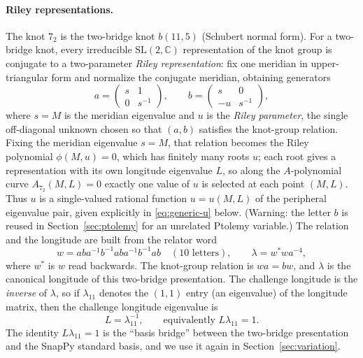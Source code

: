 \documentclass[11pt]{article}
\theoremstyle{definition}
\newcommand{\C}{\mathbb{C}}
\newcommand{\SL}{\mathrm{SL}}
\begin{document}
\paragraph{Riley representations.}
The knot $7_2$ is the two-bridge knot $b(11,5)$ (Schubert normal form).  For a
two-bridge knot, every irreducible $\SL(2,\C)$ representation of the knot group
is conjugate to a two-parameter \emph{Riley representation}: fix one meridian in
upper-triangular form and normalize the conjugate meridian, obtaining generators
\begin{equation}\label{eq:riley}
 a=\begin{pmatrix}s&1\\0&s^{-1}\end{pmatrix},\qquad
 b=\begin{pmatrix}s&0\\-u&s^{-1}\end{pmatrix},
\end{equation}
where $s=M$ is the meridian eigenvalue and $u$ is the \emph{Riley parameter},
the single off-diagonal unknown chosen so that $(a,b)$ satisfies the knot-group
relation.  Fixing the meridian eigenvalue $s=M$, that relation becomes the Riley
polynomial $\phi(M,u)=0$, which has finitely many roots $u$; each root gives a
representation with its own longitude eigenvalue $L$, so along the $A$-polynomial
curve $A_{7_2}(M,L)=0$ exactly one value of $u$ is selected at each point
$(M,L)$.  Thus $u$ is a single-valued rational function $u=u(M,L)$ of the
peripheral eigenvalue pair, given explicitly in \eqref{eq:generic-u} below.
(Warning: the letter $b$ is reused in Section~\ref{sec:ptolemy} for
an unrelated Ptolemy variable.)  The relation and the longitude are built from
the relator word
\begin{equation}\label{eq:word}
 w=aba^{-1}b^{-1}aba^{-1}b^{-1}ab
 \quad(\text{10 letters}),
 \qquad \lambda=w^*wa^{-4},
\end{equation}
where $w^*$ is $w$ read backwards.  The knot-group relation is $wa=bw$, and
$\lambda$ is the canonical longitude of this two-bridge presentation.  The
challenge longitude is the \emph{inverse} of $\lambda$, so if $\lambda_{11}$
denotes the $(1,1)$ entry (an eigenvalue) of the longitude matrix, then the
challenge longitude eigenvalue is
\begin{equation}\label{eq:Llambda}
 L=\lambda_{11}^{-1},\qquad\text{equivalently } L\lambda_{11}=1.
\end{equation}
The identity $L\lambda_{11}=1$ is the ``basis bridge'' between the two-bridge
presentation and the SnapPy standard basis, and we use it again in
Section~\ref{sec:variation}.
\end{document}
